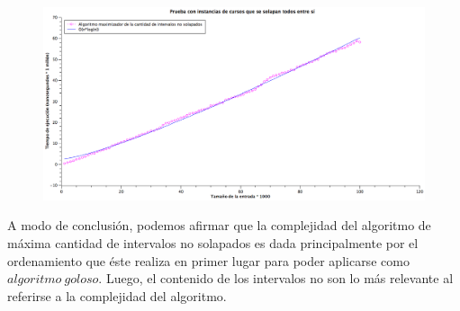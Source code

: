 \begin{figure}[H] %
\begin{center}
\includegraphics[width=460pt]{../imgs/graficoej2_solapados.png}
\end{center}
\end{figure}

A modo de conclusión, podemos afirmar que la complejidad del algoritmo de máxima cantidad de intervalos no solapados es dada principalmente por el ordenamiento que éste realiza en primer lugar para poder aplicarse como $algoritmo\ goloso$. Luego, el contenido de los intervalos no son lo más relevante al referirse a la complejidad del algoritmo.
